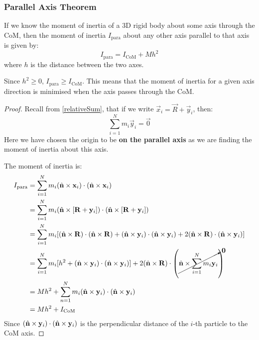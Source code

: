 \documentclass[../main.tex]{subfiles}
\begin{document}
\subsubsection{Parallel Axis Theorem}
\begin{lemma}
  If we know the moment of inertia of a 3D rigid body about some axis through the CoM, then the moment of inertia $I_{\text{para}}$ about any other axis parallel to that axis is given by:
  \label{parallelAxisTheorem}
  \[
    I_{\text{para}} = I_{\text{CoM}} + Mh^2
  \]
  where $h$ is the distance between the two axes.
\end{lemma}
\begin{remark}
  Since $h^2 \geq 0$, $I_{\text{para}} \geq I_{\text{CoM}}$.
  This means that the moment of inertia for a given axis direction is minimised when the axis passes through the CoM.
\end{remark}
\begin{proof}
  Recall from \cref{relativeSum}, that if we write $\vec{x}_i = \vec{R} + \vec{y}_i$, then:
  \[
    \sum_{i = 1}^{N} m_i \vec{y}_i = \vec{0}
  \]
  Here we have chosen the origin to be \textbf{on the parallel axis} as we are finding the moment of inertia about this axis.

  The moment of inertia is:
  \begin{align*}
    I_{\text{para}} &= \sum_{i = 1}^{N} m_i (\hat{\mathbf{\bm{n}}} \times \mathbf{\bm{x}}_i) \cdot (\hat{\mathbf{\bm{n}}} \times \mathbf{\bm{x}}_i) \\
                    &= \sum_{i = 1}^{N} m_i (\hat{\mathbf{\bm{n}}} \times [\mathbf{\bm{R}} + \mathbf{\bm{y}}_i]) \cdot (\hat{\mathbf{\bm{n}}} \times [\mathbf{\bm{R}} + \mathbf{\bm{y}}_i]) \\
                    &= \sum_{i = 1}^{N} m_i [(\hat{\mathbf{\bm{n}}} \times \mathbf{\bm{R}}) \cdot (\hat{\mathbf{\bm{n}}} \times \mathbf{\bm{R}}) + (\hat{\mathbf{\bm{n}}} \times \mathbf{\bm{y}}_i) \cdot (\hat{\mathbf{\bm{n}}} \times \mathbf{\bm{y}}_i) + 2(\hat{\mathbf{\bm{n}}} \times \mathbf{\bm{R}}) \cdot (\hat{\mathbf{\bm{n}}} \times \mathbf{\bm{y}}_i)] \\
                    &= \sum_{i = 1}^{N} m_i [h^2 + (\hat{\mathbf{\bm{n}}} \times \mathbf{\bm{y}}_i) \cdot (\hat{\mathbf{\bm{n}}} \times \mathbf{\bm{y}}_i)] + 2(\hat{\mathbf{\bm{n}}} \times \mathbf{\bm{R}}) \cdot \left(\cancelto{\mathbf{\bm{0}}}{\hat{\mathbf{\bm{n}}} \times \sum_{i = 1}^{N} m_i \mathbf{\bm{y}}_i}\right) \\
                    &= Mh^2 + \sum_{n = 1}^{N} m_i (\hat{\mathbf{\bm{n}}} \times \mathbf{\bm{y}}_i) \cdot (\hat{\mathbf{\bm{n}}} \times \mathbf{\bm{y}}_i) \\
                    &= Mh^2 + I_{\text{CoM}}
  \end{align*}
  Since $(\hat{\mathbf{\bm{n}}} \times \mathbf{\bm{y}}_i) \cdot (\hat{\mathbf{\bm{n}}} \times \mathbf{\bm{y}}_i)$ is the perpendicular distance of the $i$-th particle to the CoM axis.
\end{proof}
\end{document}
